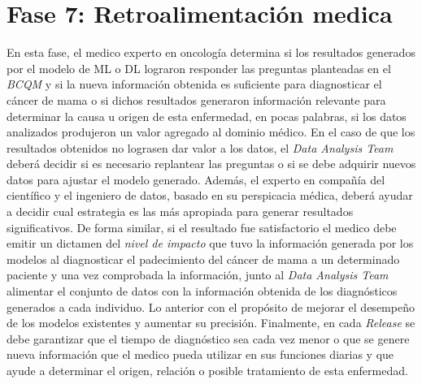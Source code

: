 \section{Fase 7: Retroalimentación medica }
En esta fase, el medico experto en oncología determina si los resultados generados por el modelo de ML o DL lograron responder las preguntas planteadas en el \textit{BCQM} y si la nueva información obtenida es suficiente para diagnosticar el cáncer de mama o si dichos resultados generaron información relevante para determinar la causa u origen de esta enfermedad, en pocas palabras, si los datos analizados produjeron un valor agregado al dominio médico. En el caso de que los resultados obtenidos no lograsen dar valor a los datos, el \textit{Data Analysis Team} deberá decidir si es necesario replantear las preguntas o si se debe adquirir nuevos datos para ajustar el modelo generado. Además, el experto en compañía del científico y el ingeniero de datos, basado en su perspicacia médica, deberá ayudar a decidir cual estrategia es las más apropiada para generar resultados significativos. De forma similar, si el resultado fue satisfactorio el medico debe emitir un dictamen del \textit{nivel de impacto} que tuvo la información generada por los modelos al diagnosticar el padecimiento del cáncer de mama a un determinado paciente y una vez comprobada la información, junto al \textit{Data Analysis Team} alimentar el conjunto de datos con la información obtenida de los diagnósticos generados a cada individuo. Lo anterior con el propósito de mejorar el desempeño de los modelos existentes y aumentar su precisión. Finalmente, en cada \textit{Release} se debe garantizar que el tiempo de diagnóstico sea cada vez menor o que se genere nueva información que el medico pueda utilizar en sus funciones diarias y que ayude a determinar el origen, relación o posible tratamiento de esta enfermedad.

